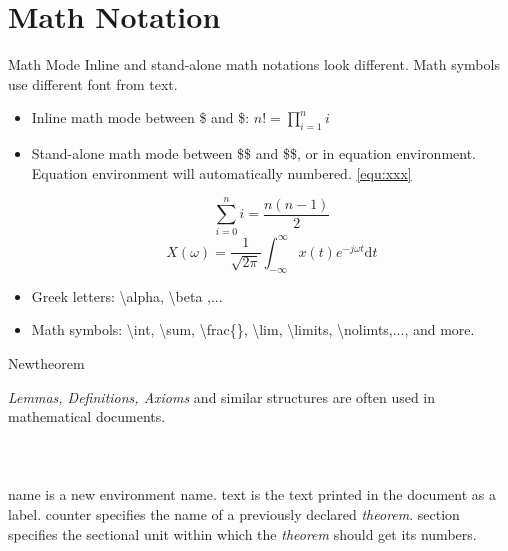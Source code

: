 \documentclass[10pt]{beamer}
\begin{document}
\section{Math Notation}
\begin{frame}{Math Mode}
    Inline and stand-alone math notations look different. Math symbols
    use different font from text.
\begin{itemize}
    \item Inline math mode between \$ and \$: $n!=\prod_{i=1}^n i$
    \item Stand-alone math mode between \$\$ and \$\$, or in
        \alert{equation} environment. Equation environment will
		automatically numbered.  \ref{equ:xxx}

		\begin{equation}\label{equ:xxx}
            \sum_{i=0}^n i = \frac{n (n-1)}{2} \nonumber
        \end{equation}
        \begin{equation}
            X(\omega) =\frac{1}{\sqrt{2\pi}} \int_{-\infty}^{\infty}
                x(t) e^{-j\omega t}\mathrm{d} t
        \end{equation}
    \item Greek letters: \textbackslash alpha, \textbackslash beta ,...
    \item Math symbols: \textbackslash int, \textbackslash sum,
        \textbackslash frac\{\}, \textbackslash lim,
        \textbackslash limits, \textbackslash nolimts,..., and more.

\end{itemize}
\end{frame}

\begin{frame}{Newtheorem}

{\em Lemmas, Definitions, Axioms} and similar structures are often used
in mathematical documents.
\ \\ \ \\

\ \\ \ \\

\alert{name} is a new environment name. \alert{text} is the text
printed in the document as a label. \alert{counter} specifies the 
name of a previously declared {\em theorem}. \alert{section} specifies
the sectional unit within which the {\em theorem} should get its numbers.

\end{frame}
\end{document}
